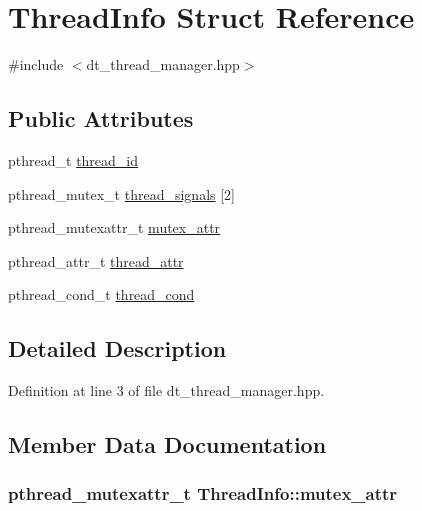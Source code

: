 \hypertarget{struct_thread_info}{
\section{ThreadInfo Struct Reference}
\label{struct_thread_info}
}


{\ttfamily \#include $<$dt\_\-thread\_\-manager.hpp$>$}\subsection*{Public Attributes}
\begin{DoxyCompactItemize}
\item 
pthread\_\-t \hyperlink{struct_thread_info_aec69ec1d73a2c22520ead441b0f90f25}{thread\_\-id}
\item 
pthread\_\-mutex\_\-t \hyperlink{struct_thread_info_aef3356f4a3ec181af92e1b1703ffc9f7}{thread\_\-signals} \mbox{[}2\mbox{]}
\item 
pthread\_\-mutexattr\_\-t \hyperlink{struct_thread_info_aaba97763e4f3446bc74bfb6f56962e74}{mutex\_\-attr}
\item 
pthread\_\-attr\_\-t \hyperlink{struct_thread_info_ab37b607645487d10df4fab2dd4671aa6}{thread\_\-attr}
\item 
pthread\_\-cond\_\-t \hyperlink{struct_thread_info_a51306079f645f2947a05008b49637382}{thread\_\-cond}
\end{DoxyCompactItemize}


\subsection{Detailed Description}


Definition at line 3 of file dt\_\-thread\_\-manager.hpp.

\subsection{Member Data Documentation}
\hypertarget{struct_thread_info_aaba97763e4f3446bc74bfb6f56962e74}{
\subsubsection[{mutex\_\-attr}]{\setlength{\rightskip}{0pt plus 5cm}pthread\_\-mutexattr\_\-t {\bf ThreadInfo::mutex\_\-attr}}}
\label{struct_thread_info_aaba97763e4f3446bc74bfb6f56962e74}


